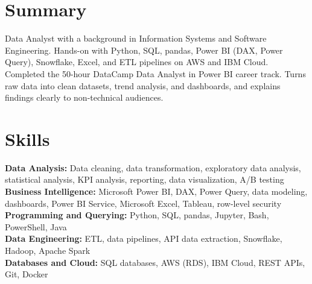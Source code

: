 \documentclass[a4paper,10pt]{article}
\begin{document}

\section*{Summary}
Data Analyst with a background in Information Systems and Software Engineering. Hands-on with Python, SQL, pandas, Power BI (DAX, Power Query), Snowflake, Excel, and ETL pipelines on AWS and IBM Cloud. Completed the 50-hour DataCamp Data Analyst in Power BI career track. Turns raw data into clean datasets, trend analysis, and dashboards, and explains findings clearly to non-technical audiences.

\section*{Skills}
\textbf{Data Analysis:} Data cleaning, data transformation, exploratory data analysis, statistical analysis, KPI analysis, reporting, data visualization, A/B testing \\
\textbf{Business Intelligence:} Microsoft Power BI, DAX, Power Query, data modeling, dashboards, Power BI Service, Microsoft Excel, Tableau, row-level security \\
\textbf{Programming and Querying:} Python, SQL, pandas, Jupyter, Bash, PowerShell, Java\\
\textbf{Data Engineering:} ETL, data pipelines, API data extraction, Snowflake, Hadoop, Apache Spark\\
\textbf{Databases and Cloud:} SQL databases, AWS (RDS), IBM Cloud, REST APIs, Git, Docker
\end{document}
